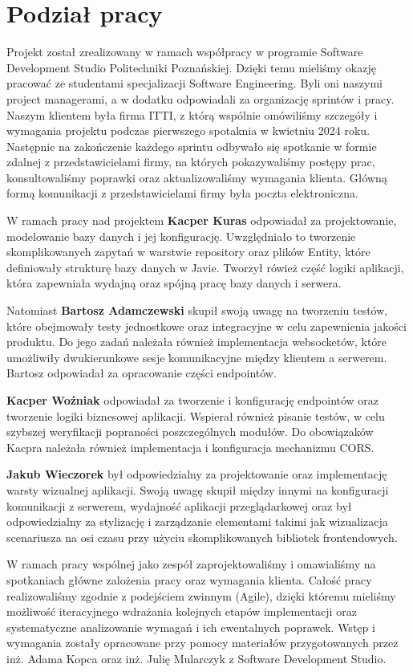 \section{Podział pracy}
Projekt został zrealizowany w ramach współpracy w programie Software Development Studio Politechniki Poznańskiej. Dzięki temu mieliśmy okazję pracować ze studentami
specjalizacji Software Engineering. Byli oni naszymi project managerami, a w dodatku odpowiadali za organizację sprintów i pracy. Naszym klientem była firma ITTI, z którą
wspólnie omówiliśmy szczegóły i wymagania projektu podczas pierwszego spotaknia w kwietniu 2024 roku. Następnie na zakończenie każdego sprintu odbywało się spotkanie w formie zdalnej
z przedstawicielami firmy, na których pokazywaliśmy postępy prac, konsultowaliśmy poprawki oraz aktualizowaliśmy wymagania klienta. Główną formą komunikacji z przedstawicielami firmy
była poczta elektroniczna.

W ramach pracy nad projektem \textbf{Kacper Kuras} odpowiadał za projektowanie, modelowanie bazy danych i jej konfigurację. Uwzględniało
to tworzenie skomplikowanych zapytań w warstwie repository oraz plików Entity, które definiowały strukturę bazy danych w Javie. Tworzył rówież część logiki aplikacji, która zapewniała wydajną oraz spójną pracę bazy danych i serwera.

Natomiast \textbf{Bartosz Adamczewski} skupił swoją uwagę na tworzeniu testów, które obejmowały testy jednostkowe oraz integracyjne w celu zapewnienia jakości produktu.
Do jego zadań należała również implementacja websocketów, które umożliwiły dwukierunkowe sesje komunikacyjne między klientem a serwerem. Bartosz odpowiadał za opracowanie części endpointów.

\textbf{Kacper Woźniak} odpowiadał za tworzenie i konfigurację endpointów oraz tworzenie logiki biznesowej aplikacji. Wspierał również pisanie testów, w celu szybszej weryfikacji popraności poszczególnych modułów.
Do obowiązaków Kacpra należała również implementacja i konfiguracja mechanizmu CORS.

\textbf{Jakub Wieczorek} był odpowiedzialny za projektowanie oraz implementację warsty wizualnej aplikacji. Swoją uwagę skupił między innymi na konfiguracji komunikacji z serwerem, wydajność aplikacji przeglądarkowej oraz
był odpowiedzialny za stylizację i zarządzanie elementami takimi jak wizualizacja scenariusza na osi czasu przy użyciu skomplikowanych bibliotek frontendowych.

W ramach pracy wspólnej jako zespół zaprojektowaliśmy i omawialiśmy na spotkaniach główne zalożenia pracy oraz wymagania klienta. Całość pracy realizowaliśmy zgodnie z podejściem zwinnym (Agile), dzięki któremu mieliśmy możliwość iteracyjnego wdrażania
kolejnych etapów implementacji oraz systematyczne analizowanie wymagań i ich ewentalnych poprawek. Wstęp i wymagania zostały opracowane przy pomocy materiałów przygotowanych przez inż. Adama Kopca oraz inż. Julię Mularczyk z Software Development Studio.

